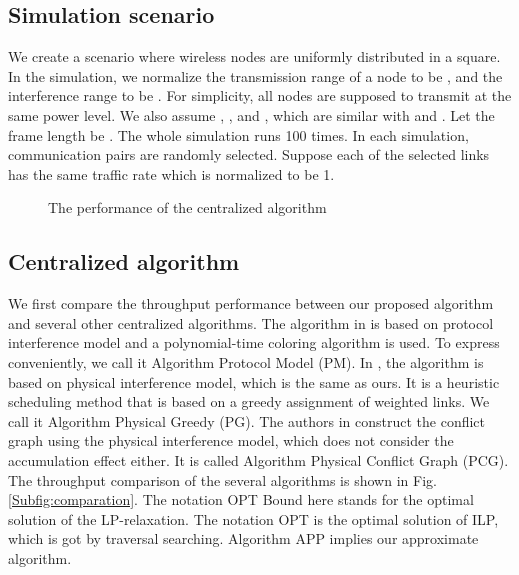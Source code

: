 \documentclass[conference]{IEEEtran}
\begin{document}
\subsection{Simulation scenario}
We create a scenario where wireless nodes are uniformly distributed
in a  square. In the simulation, we normalize the
transmission range of a node to be , and the interference
range to be . For simplicity, all nodes are supposed to
transmit at the same power level. We also assume , , and , which are similar with \cite{behzad2003pgb}
and \cite{yi2007optimal}. Let the frame length be . The whole
simulation runs 100 times. In each simulation,  communication
pairs are randomly selected. Suppose each of the selected links has
the same traffic rate which is normalized to be 1.
\begin{figure}[tbhp!]
\centerline{ \hfil {}}

\centerline{  \hfil
{}}
\label{Fig:centrlized algorithm} \caption{The performance of the
centralized algorithm}
\end{figure}






\subsection{Centralized algorithm}
We first compare the throughput performance between our proposed
algorithm and several other centralized algorithms. The algorithm in
\cite{ramanathan1993sam} is based on protocol interference model and
a polynomial-time coloring algorithm is used. To express
conveniently, we call it Algorithm Protocol Model (PM). In
\cite{brar2006ces}, the algorithm is based on physical interference
model, which is the same as ours. It is a heuristic scheduling
method that is based on a greedy assignment of weighted links. We
call it Algorithm Physical Greedy (PG). The authors in
\cite{behzad2007oil} construct the conflict graph using the physical
interference model, which does not consider the accumulation effect
either. It is called Algorithm Physical Conflict Graph (PCG). The
throughput comparison of the several algorithms is shown in
Fig.\ref{Subfig:comparation}. The notation OPT Bound here stands for
the optimal solution of the LP-relaxation. The notation OPT is the
optimal solution of ILP, which is got by traversal searching.
Algorithm APP implies our approximate algorithm.
\end{document}
